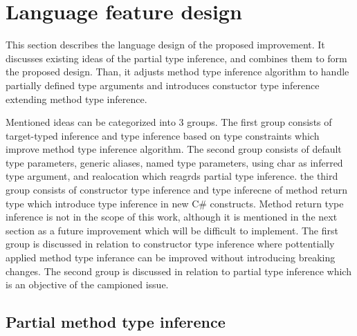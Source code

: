 \section{Language feature design}

This section describes the language design of the proposed improvement.
It discusses existing ideas of the partial type inference, and combines them to form the proposed design.
Than, it adjusts method type inference algorithm to handle partially defined type arguments and introduces constuctor type inference extending method type inference.
\par
{}
Mentioned ideas can be categorized into 3 groups.
The first group consists of target-typed inference and type inference based on type constraints which improve method type inference algorithm.
The second group consists of default type parameters, generic aliases, named type parameters, using char as inferred type argument, and realocation which reagrds partial type inference.
the third group consists of constructor type inference and type inferecne of method return type which introduce type inference in new C\# constructs.
Method return type inference is not in the scope of this work, although it is mentioned in the next section as a future improvement which will be difficult to implement.
The first group is discussed in relation to constructor type inference where pottentially applied method type inferance can be improved without introducing breaking changes.
The second group is discussed in relation to partial type inference which is an objective of the campioned issue.

\subsection{Partial method type inference}

